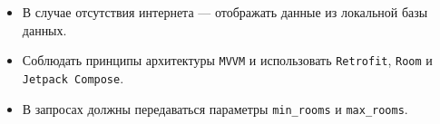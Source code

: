 \begin{itemize}
  \item В случае отсутствия интернета — отображать данные из локальной базы данных.
  \item Соблюдать принципы архитектуры \texttt{MVVM} и использовать \texttt{Retrofit}, \texttt{Room} и \texttt{Jetpack Compose}.
  \item В запросах должны передаваться параметры \texttt{min_rooms} и \texttt{max_rooms}.
\end{itemize}
